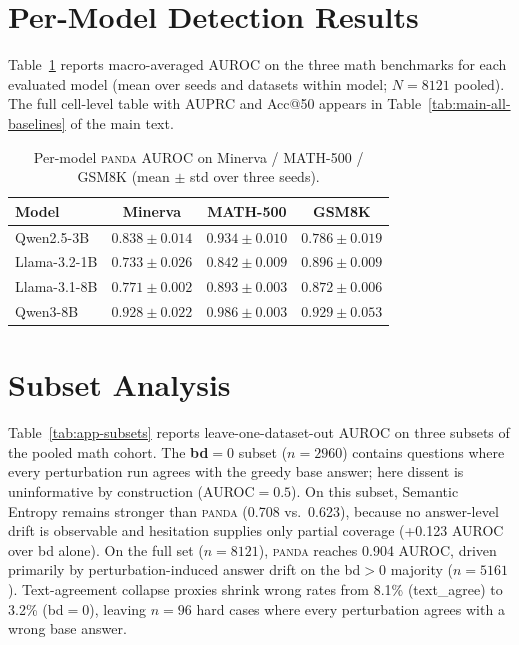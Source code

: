 \documentclass{article} %
\DeclareRobustCommand{\method}{%
  \texorpdfstring{%
    \ifmmode\text{\normalfont\textsc{panda}}\else\textsc{panda}\xspace\fi
  }{PANDA}%
}
\begin{document}
\section{Per-Model Detection Results}
\label{app:per-model}

Table~\ref{tab:app-per-model} reports macro-averaged AUROC on the three math benchmarks for each evaluated model (mean over seeds and datasets within model; $N{=}8121$ pooled).
The full cell-level table with AUPRC and Acc@50 appears in Table~\ref{tab:main-all-baselines} of the main text.

\begin{table}[t]
  \centering
  \small
  \caption{Per-model \method{} AUROC on Minerva / MATH-500 / GSM8K (mean $\pm$ std over three seeds).}
  \label{tab:app-per-model}
  \begin{tabular}{lccc}
    \toprule
    Model & Minerva & MATH-500 & GSM8K \\
    \midrule
    Qwen2.5-3B  & $0.838 \pm 0.014$ & $0.934 \pm 0.010$ & $0.786 \pm 0.019$ \\
    Llama-3.2-1B & $0.733 \pm 0.026$ & $0.842 \pm 0.009$ & $0.896 \pm 0.009$ \\
    Llama-3.1-8B & $0.771 \pm 0.002$ & $0.893 \pm 0.003$ & $0.872 \pm 0.006$ \\
    Qwen3-8B    & $0.928 \pm 0.022$ & $0.986 \pm 0.003$ & $0.929 \pm 0.053$ \\
    \bottomrule
  \end{tabular}
\end{table}


\section{Subset Analysis}
\label{app:subsets}

Table~\ref{tab:app-subsets} reports leave-one-dataset-out AUROC on three subsets of the pooled math cohort.
The \textbf{bd$=0$} subset ($n{=}2960$) contains questions where every perturbation run agrees with the greedy base answer; here dissent is uninformative by construction (AUROC$=0.5$).
On this subset, Semantic Entropy remains stronger than \method{} (0.708 vs.\ 0.623), because no answer-level drift is observable and hesitation supplies only partial coverage (+0.123 AUROC over bd alone).
On the full set ($n{=}8121$), \method{} reaches 0.904 AUROC, driven primarily by perturbation-induced answer drift on the bd$>0$ majority ($n{=}5161$).
Text-agreement collapse proxies shrink wrong rates from 8.1\% (text\_agree) to 3.2\% (bd$=0$), leaving $n{=}96$ hard cases where every perturbation agrees with a wrong base answer.
\end{document}
